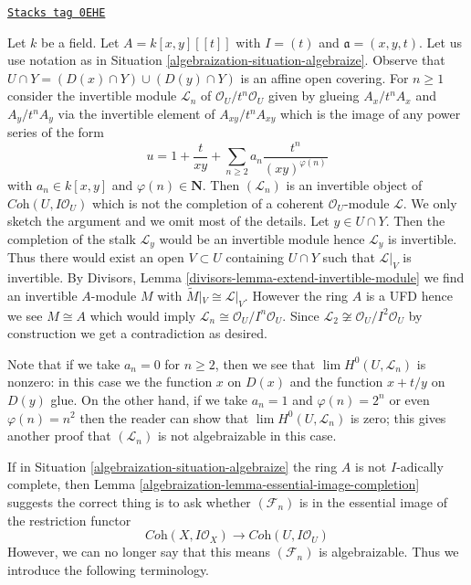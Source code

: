 \begin{example}
\label{algebraization-example-not-algebraizable}
\href{https://stacks.math.columbia.edu/tag/0EHE}{\texttt{Stacks tag 0EHE}}

Let $k$ be a field. Let $A = k[x, y][[t]]$ with $I = (t)$ and
$\mathfrak a = (x, y, t)$. Let us use notation as in
Situation \ref{algebraization-situation-algebraize}. Observe that
$U \cap Y = (D(x) \cap Y) \cup (D(y) \cap Y)$ is an affine
open covering. For $n \geq 1$ consider the invertible
module $\mathcal{L}_n$ of $\mathcal{O}_U/t^n\mathcal{O}_U$
given by glueing $A_x/t^nA_x$ and $A_y/t^nA_y$ via the invertible
element of $A_{xy}/t^nA_{xy}$ which is the image of any power series
of the form
$$
u = 1 + \frac{t}{xy} + \sum_{n \geq 2} a_n \frac{t^n}{(xy)^{\varphi(n)}}
$$
with $a_n \in k[x, y]$ and $\varphi(n) \in \mathbf{N}$.
Then $(\mathcal{L}_n)$ is an invertible object of
$\textit{Coh}(U, I\mathcal{O}_U)$ which is not the
completion of a coherent $\mathcal{O}_U$-module $\mathcal{L}$.
We only sketch the argument and we omit most of the details.
Let $y \in U \cap Y$. Then the completion of the stalk
$\mathcal{L}_y$ would be an invertible module hence $\mathcal{L}_y$
is invertible. Thus there would exist an open $V \subset U$
containing $U \cap Y$ such that $\mathcal{L}|_V$ is invertible.
By Divisors, Lemma \ref{divisors-lemma-extend-invertible-module}
we find an invertible $A$-module $M$ with
$\widetilde{M}|_V \cong \mathcal{L}|_V$. However the ring $A$
is a UFD hence we see $M \cong A$ which would imply
$\mathcal{L}_n \cong \mathcal{O}_U/I^n\mathcal{O}_U$.
Since $\mathcal{L}_2 \not \cong \mathcal{O}_U/I^2\mathcal{O}_U$
by construction we get a contradiction as desired.

\medskip\noindent
Note that if we take $a_n = 0$ for $n \geq 2$, then we see
that $\lim H^0(U, \mathcal{L}_n)$ is nonzero: in this case
we the function $x$ on $D(x)$ and the function $x + t/y$ on $D(y)$
glue. On the other hand, if we take $a_n = 1$ and $\varphi(n) = 2^n$
or even $\varphi(n) = n^2$ then the reader can show that
$\lim H^0(U, \mathcal{L}_n)$ is zero; this gives another proof
that $(\mathcal{L}_n)$ is not algebraizable in this case.
\end{example}

If in Situation \ref{algebraization-situation-algebraize} the ring $A$ is not
$I$-adically complete, then Lemma \ref{algebraization-lemma-essential-image-completion}
suggests the correct thing is to ask whether $(\mathcal{F}_n)$
is in the essential image of the restriction functor
$$
\textit{Coh}(X, I\mathcal{O}_X)
\longrightarrow
\textit{Coh}(U, I\mathcal{O}_U)
$$
However, we can no longer say that this means $(\mathcal{F}_n)$
is algebraizable. Thus we introduce the following terminology.

